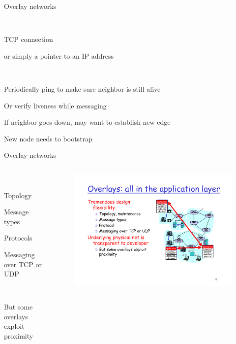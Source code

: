 \begin{frame}{Overlay networks}

\\
\BI
\item TCP connection
\item or simply a pointer to an IP address
\EI

\bigskip
{}\\
\BI
\item Periodically ping to make sure neighbor is still alive
\item Or verify liveness while messaging 
\item If neighbor goes down, may want to
establish new edge 
\item New node needs to bootstrap
\EI

\end{frame}

\begin{frame}{Overlay networks}

\begin{columns}
\begin{column}{0.4\textwidth}
\\
\BI
\item Topology
\item Message types
\item Protocols
\item Messaging over TCP or UDP
\EI

\bigskip
{}\\
\BI
\item But some overlays exploit proximity
\EI
\end{column}
\begin{column}{0.5\textwidth}
	\begin{figure}
		\includegraphics[width=1.0\textwidth]{figs/10/overlay2.pdf}
	\end{figure}
\end{column}
\end{columns}

\end{frame}

